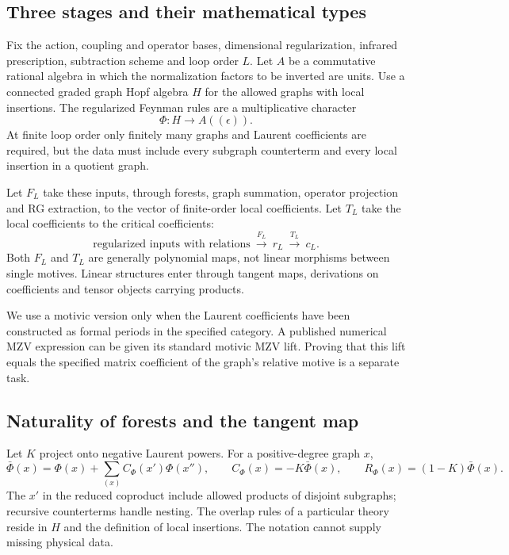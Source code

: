 \documentclass[11pt,a4paper,oneside]{article}
\theoremstyle{plain}
\theoremstyle{definition}
\theoremstyle{remark}
\numberwithin{equation}{section}
\begin{document}
\subsection{Three stages and their mathematical types}\label{sec:rg:1}
Fix the action, coupling and operator bases, dimensional regularization, infrared prescription, subtraction scheme and loop order $L$. Let $A$ be a commutative rational algebra in which the normalization factors to be inverted are units. Use a connected graded graph Hopf algebra $H$ for the allowed graphs with local insertions. The regularized Feynman rules are a multiplicative character
\begin{equation}
\Phi:H\longrightarrow A((\epsilon)).
\end{equation}
At finite loop order only finitely many graphs and Laurent coefficients are required, but the data must include every subgraph counterterm and every local insertion in a quotient graph.

Let $F_L$ take these inputs, through forests, graph summation, operator projection and RG extraction, to the vector of finite-order local coefficients. Let $T_L$ take the local coefficients to the critical coefficients:
\begin{equation}
\text{regularized inputs with relations}\ \xrightarrow{F_L}\
 r_L\ \xrightarrow{T_L}\ c_L.                    \label{eq:rg:1}
\end{equation}
Both $F_L$ and $T_L$ are generally polynomial maps, not linear morphisms between single motives. Linear structures enter through tangent maps, derivations on coefficients and tensor objects carrying products.

We use a motivic version only when the Laurent coefficients have been constructed as formal periods in the specified category. A published numerical MZV expression can be given its standard motivic MZV lift. Proving that this lift equals the specified matrix coefficient of the graph's relative motive is a separate task.

\subsection{Naturality of forests and the tangent map}\label{sec:rg:2}
Let $K$ project onto negative Laurent powers. For a positive-degree graph $x$,
\begin{equation}
\bar\Phi(x)=\Phi(x)+\sum_{(x)}C_\Phi(x')\Phi(x''),\qquad
 C_\Phi(x)=-K\bar\Phi(x),\qquad
 R_\Phi(x)=(1-K)\bar\Phi(x).                        \label{eq:rg:2}
\end{equation}
The $x'$ in the reduced coproduct include allowed products of disjoint subgraphs; recursive counterterms handle nesting. The overlap rules of a particular theory reside in $H$ and the definition of local insertions. The notation cannot supply missing physical data.
\end{document}
